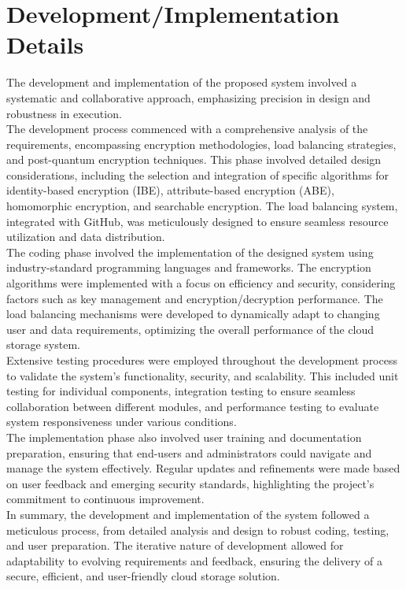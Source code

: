 \chapter{Development/Implementation Details}
The development and implementation of the proposed system involved a systematic and collaborative
approach, emphasizing precision in design and robustness in execution.\\
The development process commenced with a comprehensive analysis of the requirements,
encompassing encryption methodologies, load balancing strategies, and post-quantum encryption
techniques. This phase involved detailed design considerations, including the selection and
integration of specific algorithms for identity-based encryption (IBE), attribute-based encryption
(ABE), homomorphic encryption, and searchable encryption. The load balancing system, integrated
with GitHub, was meticulously designed to ensure seamless resource utilization and data distribution.\\
The coding phase involved the implementation of the designed system using industry-standard
programming languages and frameworks. The encryption algorithms were implemented with a focus
on efficiency and security, considering factors such as key management and encryption/decryption
performance. The load balancing mechanisms were developed to dynamically adapt to changing user
and data requirements, optimizing the overall performance of the cloud storage system.\\
Extensive testing procedures were employed throughout the development process to validate the
system's functionality, security, and scalability. This included unit testing for individual components,
integration testing to ensure seamless collaboration between different modules, and performance
testing to evaluate system responsiveness under various conditions.\\
The implementation phase also involved user training and documentation preparation, ensuring that
end-users and administrators could navigate and manage the system effectively. Regular updates and
refinements were made based on user feedback and emerging security standards, highlighting the
project's commitment to continuous improvement.\\
In summary, the development and implementation of the system followed a meticulous process, from
detailed analysis and design to robust coding, testing, and user preparation. The iterative nature of
development allowed for adaptability to evolving requirements and feedback, ensuring the delivery of
a secure, efficient, and user-friendly cloud storage solution. 
\clearpage